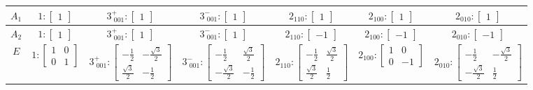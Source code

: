 \documentclass[fleqn,8pt,landscape]{jsarticle}
\begin{document}
\begin{longtable}{ccccccc}
$ A_{1} $ & $ 1:\begin{bmatrix} 1 \end{bmatrix} $ & $ 3^{+}_{\,\,001}:\begin{bmatrix} 1 \end{bmatrix} $ & $ 3^{-}_{\,\,001}:\begin{bmatrix} 1 \end{bmatrix} $ & $ 2{}_{110}:\begin{bmatrix} 1 \end{bmatrix} $ & $ 2{}_{100}:\begin{bmatrix} 1 \end{bmatrix} $ & $ 2{}_{010}:\begin{bmatrix} 1 \end{bmatrix} $ \\ \hline
$ A_{2} $ & $ 1:\begin{bmatrix} 1 \end{bmatrix} $ & $ 3^{+}_{\,\,001}:\begin{bmatrix} 1 \end{bmatrix} $ & $ 3^{-}_{\,\,001}:\begin{bmatrix} 1 \end{bmatrix} $ & $ 2{}_{110}:\begin{bmatrix} -1 \end{bmatrix} $ & $ 2{}_{100}:\begin{bmatrix} -1 \end{bmatrix} $ & $ 2{}_{010}:\begin{bmatrix} -1 \end{bmatrix} $ \\ \hline
$ E $ & $ 1:\begin{bmatrix} 1 & 0 \\ 0 & 1 \end{bmatrix} $ & $ 3^{+}_{\,\,001}:\begin{bmatrix} - \frac{1}{2} & - \frac{\sqrt{3}}{2} \\ \frac{\sqrt{3}}{2} & - \frac{1}{2} \end{bmatrix} $ & $ 3^{-}_{\,\,001}:\begin{bmatrix} - \frac{1}{2} & \frac{\sqrt{3}}{2} \\ - \frac{\sqrt{3}}{2} & - \frac{1}{2} \end{bmatrix} $ & $ 2{}_{110}:\begin{bmatrix} - \frac{1}{2} & \frac{\sqrt{3}}{2} \\ \frac{\sqrt{3}}{2} & \frac{1}{2} \end{bmatrix} $ & $ 2{}_{100}:\begin{bmatrix} 1 & 0 \\ 0 & -1 \end{bmatrix} $ & $ 2{}_{010}:\begin{bmatrix} - \frac{1}{2} & - \frac{\sqrt{3}}{2} \\ - \frac{\sqrt{3}}{2} & \frac{1}{2} \end{bmatrix} $ \\
\end{longtable}
\end{document}
